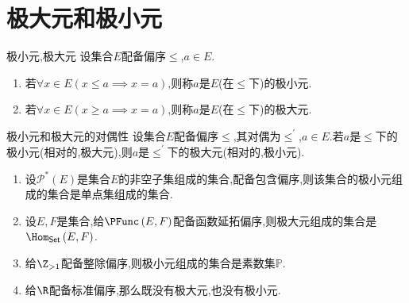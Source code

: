 \section{极大元和极小元}

\begin{definition}{极小元,极大元}{}
	设集合$E$配备偏序$\leq$,$a\in E$.
	\begin{enumerate}
		\item 若$\forall x\in E\left(x\leq a\implies x=a\right)$,则称$a$是$E$(在$\leq$下)的极小元.
		\item 若$\forall x\in E\left(x\geq a\implies x=a\right)$,则称$a$是$E$(在$\leq$下)的极大元.
	\end{enumerate}
\end{definition}

\begin{proposition}{极小元和极大元的对偶性}{}
	设集合$E$配备偏序$\leq$,其对偶为$\leq^{\prime}$,$a\in E$.若$a$是$\leq$下的极小元(相对的,极大元),则$a$是$\leq^{\prime}$下的极大元(相对的,极小元).
\end{proposition}

\begin{example}{}{}
	\begin{enumerate}
		\item 设$\mathcal{P}^{\ast}\left(E\right)$是集合$E$的非空子集组成的集合,配备包含偏序,则该集合的极小元组成的集合是单点集组成的集合.
		\item 设$E,F$是集合,给$\PFunc\left(E,F\right)$配备函数延拓偏序,则极大元组成的集合是$\Hom_{\mathsf{Set}}\left(E,F\right)$.
		\item 给$\Z_{>1}$配备整除偏序,则极小元组成的集合是素数集$\mathbb{P}$.
		\item 给$\R$配备标准偏序,那么既没有极大元,也没有极小元.
	\end{enumerate}
\end{example}







